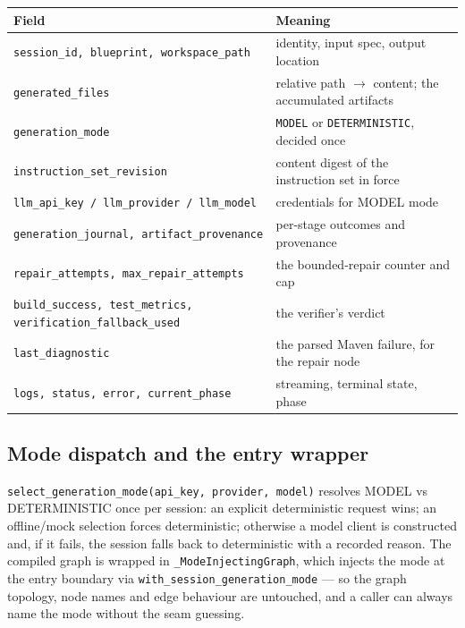 \documentclass[11pt,a4paper]{article}
\begin{document}
\begin{center}
\begin{longtable}{@{}p{}p{}@{}}
\toprule
\textbf{Field} & \textbf{Meaning} \\
\midrule
\texttt{session\_id, blueprint, workspace\_path} & identity, input spec, output location \\
\texttt{generated\_files} & relative path $\rightarrow$ content; the accumulated artifacts \\
\texttt{generation\_mode} & \texttt{MODEL} or \texttt{DETERMINISTIC}, decided once \\
\texttt{instruction\_set\_revision} & content digest of the instruction set in force \\
\texttt{llm\_api\_key / llm\_provider / llm\_model} & credentials for MODEL mode \\
\texttt{generation\_journal, artifact\_provenance} & per-stage outcomes and provenance \\
\texttt{repair\_attempts, max\_repair\_attempts} & the bounded-repair counter and cap \\
\texttt{build\_success, test\_metrics, verification\_fallback\_used} & the verifier's verdict \\
\texttt{last\_diagnostic} & the parsed Maven failure, for the repair node \\
\texttt{logs, status, error, current\_phase} & streaming, terminal state, phase \\
\bottomrule
\end{longtable}
\end{center}

\subsection{Mode dispatch and the entry wrapper}

\texttt{select\_generation\_mode(api\_key, provider, model)} resolves MODEL vs
DETERMINISTIC once per session: an explicit deterministic request wins; an
offline/mock selection forces deterministic; otherwise a model client is constructed
and, if it fails, the session falls back to deterministic with a recorded reason. The
compiled graph is wrapped in \texttt{\_ModeInjectingGraph}, which injects the mode at
the entry boundary via \texttt{with\_session\_generation\_mode} --- so the graph
topology, node names and edge behaviour are untouched, and a caller can always name
the mode without the seam guessing.
\end{document}
